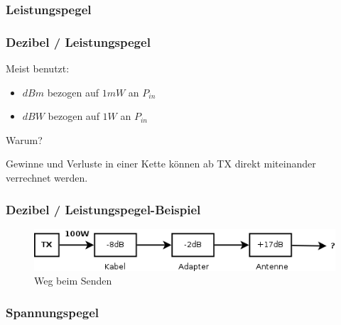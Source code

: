 \subsubsection{Leistungspegel}

\begin{frame}
  \frametitle{Dezibel / Leistungspegel}

  Meist benutzt:

  \begin{itemize}
    \item $dBm$ bezogen auf $1 mW$ an $P_{in}$
    \item $dBW$ bezogen auf $1 W$ an $P_{in}$
  \end{itemize}

  \begin{center}
    Warum?
  \end{center}

  \pause

  Gewinne und Verluste in einer Kette können ab TX direkt miteinander
  verrechnet werden.

\end{frame}

\begin{frame}
  \frametitle{Dezibel / Leistungspegel-Beispiel}

  \begin{figure}
    \includegraphics[width=1\textwidth]{a01/TX-Pfad}
    \caption{Weg beim Senden}
  \end{figure}

  \vspace{3em}


\end{frame}

\subsubsection{Spannungspegel}

